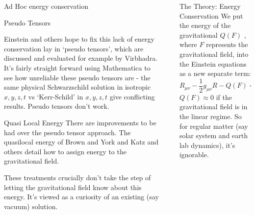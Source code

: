 \documentclass[final]{beamer}
\newlength{\sepwidth}
\newlength{\colwidth}
\newcommand{\separatorcolumn}{\begin{column}{\sepwidth}\end{column}}
\begin{document}
\begin{frame}[t]
\begin{columns}[t]
\begin{column}{\colwidth}
\begin{block}{Ad Hoc energy conservation}
  \end{block}

  \begin{block}{Pseudo Tensors}


Einstein and others hope to fix this lack of energy conservation lay in `pseudo tensors', which are discussed and evaluated for example by Virbhadra\cite{virbhadraEnergyDistributionKerrNewman1990}\cite{virbhadraEnergyMomentumVaidya1992}. It's fairly straight forward using Mathematica to see how unreliable these pseudo tensors are - the same physical Schwarzschild solution in isotropic $x,y,z,t$ vs `Kerr-Schild' in $x,y,z,t$ give conflicting results\cite{RzeroMathematicaSchwarschildpseudoChecknb}. Pseudo tensors don't work.
  \end{block}

  \begin{block}{Quasi Local Energy}
There are improvements to be had over the pseudo tensor approach. The quasilocal energy of Brown and York\cite{Brown1993} and Katz\cite{Katz2005} and others \cite{haroNoethersTheoremsEnergy2021}\cite{lyndenbell1985}\cite{changPseudotensorsQuasilocalEnergymomentum1999} detail how to assign energy to the gravitational field. 

These treatments crucially don't take the step of letting the gravitational field know about this energy. It's viewed as a curiosity of an existing (say vacuum) solution. 
  \end{block}


\end{column}

\separatorcolumn


\begin{column}{\colwidth}
  \begin{block}{The Theory: Energy Conservation}
We put the energy of the gravitational $Q(F)$ , where $F$ represents the gravitational field, into the Einstein equations as a new separate term: 
  \begin{equation}
R_{\mu\nu}-\dfrac{1}{2}g_{\mu\nu}R - Q(F) = 8\pi G T_{\mu \nu}.
\label{newEquation}
\end{equation}
	$Q(F) \approx 0$ if the gravitational field is in the linear regime. So for regular matter (say solar system and earth lab dynamics), it's ignorable. 
	

\end{block}
\end{column}
\end{columns}
\end{frame}
\end{document}
